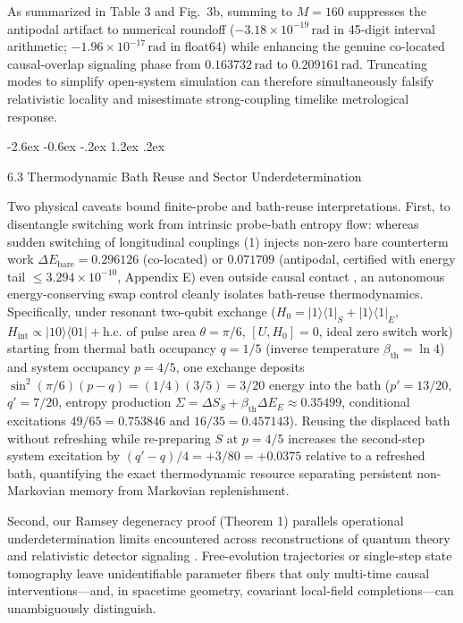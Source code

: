 \documentclass[11pt,letterpaper]{article}
\makeatletter
\renewcommand\subsection{\@startsection{subsection}{2}{\z@}%
  {-2.6ex \@plus -0.6ex \@minus -.2ex}%
  {1.2ex \@plus .2ex}%
  {\normalfont\large\bfseries\raggedright\hyphenpenalty=10000}}
\theoremstyle{definition}
\makeatother
\begin{document}
As summarized in Table 3 and Fig.~3b, summing to \(M = 160\) suppresses
the antipodal artifact to numerical roundoff
(\(-3.18 \times 10^{-19}\,\mathrm{rad}\) in 45-digit interval
arithmetic; \(-1.96 \times 10^{-17}\,\mathrm{rad}\) in float64) while
enhancing the genuine co-located causal-overlap signaling phase from
\(0.163732\,\mathrm{rad}\) to \(0.209161\,\mathrm{rad}\). Truncating
modes to simplify open-system simulation can therefore simultaneously
falsify relativistic locality and misestimate strong-coupling timelike
metrological response.

\subsection{6.3 Thermodynamic Bath Reuse and Sector
Underdetermination}\label{thermodynamic-bath-reuse-and-sector-underdetermination}

Two physical caveats bound finite-probe and bath-reuse interpretations.
First, to disentangle switching work from intrinsic probe-bath entropy
flow: whereas sudden switching of longitudinal couplings (1) injects
non-zero bare counterterm work \(\Delta E_{\mathrm{bare}} = 0.296126\)
(co-located) or \(0.071709\) (antipodal, certified with energy tail
\(\le 3.294 \times 10^{-10}\), Appendix E) even outside causal contact
\citep{poloGomez2022}, an autonomous energy-conserving swap control
cleanly isolates bath-reuse thermodynamics. Specifically, under resonant
two-qubit exchange
(\(H_0 = |1\rangle\langle 1|_S + |1\rangle\langle 1|_E\),
\(H_{\mathrm{int}} \propto |10\rangle\langle 01| + \mathrm{h.c.}\) of
pulse area \(\theta = \pi/6\), \([U, H_0] = 0\), ideal zero switch work)
starting from thermal bath occupancy \(q = 1/5\) (inverse temperature
\(\beta_{\mathrm{th}} = \ln 4\)) and system occupancy \(p = 4/5\), one
exchange deposits \(\sin^2(\pi/6)(p - q) = (1/4)(3/5) = 3/20\) energy
into the bath (\(p' = 13/20\), \(q' = 7/20\), entropy production
\(\Sigma = \Delta S_S + \beta_{\mathrm{th}} \Delta E_E \approx 0.35499\),
conditional excitations \(49/65 = 0.753846\) and \(16/35 = 0.457143\)).
Reusing the displaced bath without refreshing while re-preparing \(S\)
at \(p = 4/5\) increases the second-step system excitation by
\((q' - q)/4 = +3/80 = +0.0375\) relative to a refreshed bath,
quantifying the exact thermodynamic resource separating persistent
non-Markovian memory from Markovian replenishment.

Second, our Ramsey degeneracy proof (Theorem 1) parallels operational
underdetermination limits encountered across reconstructions of quantum
theory
\citep{chiribella2011, masanesMuller2011, dakicBrukner2011, barnumWilce2011, masanes2019, renou2021}
and relativistic detector signaling
\citep{unruhWald1984, fewsterVerch2020, bostelmann2021, deRamon2021}.
Free-evolution trajectories or single-step state tomography leave
unidentifiable parameter fibers that only multi-time causal
interventions---and, in spacetime geometry, covariant local-field
completions---can unambiguously distinguish.
\end{document}
